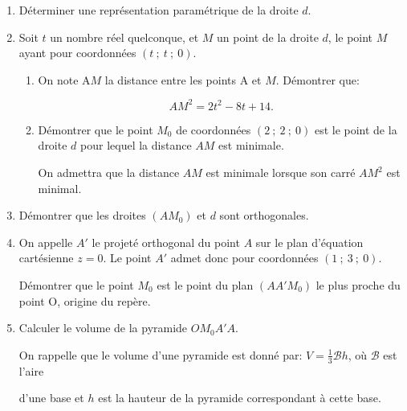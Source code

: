  \begin{enumerate}
\item  Déterminer une représentation paramétrique de la droite $d$. 

\item Soit $t$ un nombre réel quelconque, et $M$ un point de la droite $d$, le point $M$ ayant pour coordonnées $(t~;~t~;~0)$. 
\begin{enumerate}
\item  On note A$M$ la distance entre les points A et $M$. Démontrer que: 

\[AM^2 = 2t^2 - 8t+ 14.\] 

\item Démontrer que le point $M_0$ de coordonnées $(2~;~2~;~0)$ est le point de la droite $d$ pour lequel la distance $AM$ est minimale. 

On admettra que la distance $AM$ est minimale lorsque son carré $AM^2$ est minimal. 
\end{enumerate}
\item Démontrer que les droites $(AM_0)$ et $d$ sont orthogonales. 

\item On appelle $A'$ le projeté orthogonal du point $A$ sur le plan d'équation cartésienne $z = 0$. Le point $A'$ admet donc pour coordonnées $(1~;~3~;~0)$. 

Démontrer que le point $M_0$ est le point du plan $(AA'M_0)$ le plus proche du point O, origine du repère. 

\item Calculer le volume de la pyramide $OM_0A'A$. 

On rappelle que le volume d'une pyramide est donné par: $V = \frac{1}{3}\mathcal{B}h$, où $\mathcal{B}$ est l'aire  

d'une base et $h$ est la hauteur de la pyramide correspondant à cette base. 
\end{enumerate}

 \vspace{0.75cm}
 
